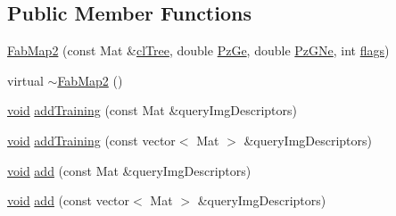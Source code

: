\subsection*{Public Member Functions}
\begin{DoxyCompactItemize}
\item 
\hyperlink{classcv_1_1of2_1_1FabMap2_a56dd45f54df76a40f5bcdbe8ee37a76c}{Fab\-Map2} (const Mat \&\hyperlink{classcv_1_1of2_1_1FabMap_a54e4331990e8069be69fec53b545c2bd}{cl\-Tree}, double \hyperlink{classcv_1_1of2_1_1FabMap_a0c79d4180f0ffe49bfbfe541b9981e7b}{Pz\-Ge}, double \hyperlink{classcv_1_1of2_1_1FabMap_a0bf851f305f6a00d5a837a7c70e40f3d}{Pz\-G\-Ne}, int \hyperlink{highgui__c_8h_ae51e3a2d4365e85db9630dd3ce9508db}{flags})
\item 
virtual \hyperlink{classcv_1_1of2_1_1FabMap2_a45a36d0ca2b0002370460c36fa2b5014}{$\sim$\-Fab\-Map2} ()
\item 
\hyperlink{legacy_8hpp_a8bb47f092d473522721002c86c13b94e}{void} \hyperlink{classcv_1_1of2_1_1FabMap2_ad4d8bd34f7898eb8654c0caa218f2faa}{add\-Training} (const Mat \&query\-Img\-Descriptors)
\item 
\hyperlink{legacy_8hpp_a8bb47f092d473522721002c86c13b94e}{void} \hyperlink{classcv_1_1of2_1_1FabMap2_a1616ff2952d4c3809cd8f416c95faf7e}{add\-Training} (const vector$<$ Mat $>$ \&query\-Img\-Descriptors)
\item 
\hyperlink{legacy_8hpp_a8bb47f092d473522721002c86c13b94e}{void} \hyperlink{classcv_1_1of2_1_1FabMap2_a85337179818b6a1ce66f40b54f947be3}{add} (const Mat \&query\-Img\-Descriptors)
\item 
\hyperlink{legacy_8hpp_a8bb47f092d473522721002c86c13b94e}{void} \hyperlink{classcv_1_1of2_1_1FabMap2_ac85a7b187c8a97d4fd316412f8889b0a}{add} (const vector$<$ Mat $>$ \&query\-Img\-Descriptors)
\end{DoxyCompactItemize}

